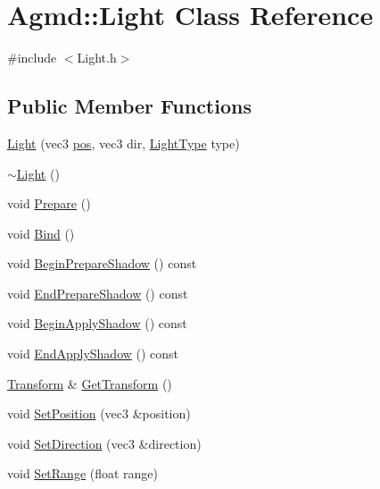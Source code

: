 \hypertarget{class_agmd_1_1_light}{\section{Agmd\+:\+:Light Class Reference}
\label{class_agmd_1_1_light}
}


{\ttfamily \#include $<$Light.\+h$>$}

\subsection*{Public Member Functions}
\begin{DoxyCompactItemize}
\item 
\hyperlink{class_agmd_1_1_light_aa560a0216af49d495220863b1594ec0b}{Light} (vec3 \hyperlink{_examples_2_planet_2_app_8cpp_aa8a1c0491559faca4ebd0881575ae7f0}{pos}, vec3 dir, \hyperlink{namespace_agmd_adacbee94d4dc3a4e858b543082fdab10}{Light\+Type} type)
\item 
\hyperlink{class_agmd_1_1_light_a3ac670a347c94a49d9ff1dfdb3dced7e}{$\sim$\+Light} ()
\item 
void \hyperlink{class_agmd_1_1_light_a32afdf3c81d2f8520b56fe1e14910ac7}{Prepare} ()
\item 
void \hyperlink{class_agmd_1_1_light_a9aeead6f02a79f039ce5d65cd922487b}{Bind} ()
\item 
void \hyperlink{class_agmd_1_1_light_a520076a8ae76e788063b137cc9539c42}{Begin\+Prepare\+Shadow} () const 
\item 
void \hyperlink{class_agmd_1_1_light_ae16674c0352a70fe69a8e1d9fc0a427c}{End\+Prepare\+Shadow} () const 
\item 
void \hyperlink{class_agmd_1_1_light_a6ec531e4b9c8c3f6e4d14e3c7ee29e27}{Begin\+Apply\+Shadow} () const 
\item 
void \hyperlink{class_agmd_1_1_light_a7f00fa32912c849560a0db13c61137b4}{End\+Apply\+Shadow} () const 
\item 
\hyperlink{class_agmd_maths_1_1_transform}{Transform} \& \hyperlink{class_agmd_1_1_light_a07f2a1540309aff3e639fbd6765e11b7}{Get\+Transform} ()
\item 
void \hyperlink{class_agmd_1_1_light_a19952c0f2db3523eab90f33d3fa79a1f}{Set\+Position} (vec3 \&position)
\item 
void \hyperlink{class_agmd_1_1_light_a9a6e84c576d06fafb67e67cc46d8de41}{Set\+Direction} (vec3 \&direction)
\item 
void \hyperlink{class_agmd_1_1_light_aa2c99bc875ea259730ff5a114d471de0}{Set\+Range} (float range)

\end{DoxyCompactItemize}
